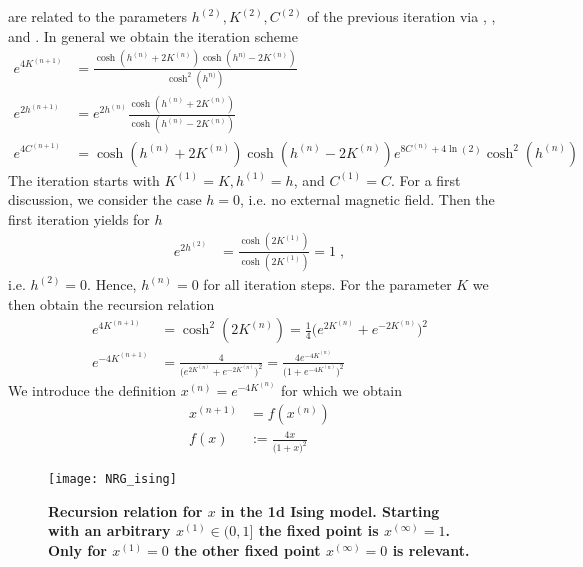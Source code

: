 are related to the parameters $h^{(2)},K^{(2)},C^{(2)}$ of the previous iteration via , , and . In general we obtain the iteration scheme
\begin{subequations}\label{eq:iteration}
\begin{align}
e^{4K^{(n+1)} } &= \frac{\cosh(h^{(n)}+2K^{(n)})\cosh(h^{n)}-2K^{(n)})}{\cosh^{2}(h^{n)})}\\
e^{2h^{(n+1)}} &= e^{2h^{(n)}}\frac{\cosh(h^{(n)}+2K^{(n)})}{\cosh(h^{(n)}-2K^{(n)})}\\
 e^{4C^{(n+1)}} &= \cosh(h^{(n)}+2K^{(n)})\cosh(h^{(n)}-2K^{(n)}) e^{8C^{(n)} + 4\ln(2)} \cosh^{2}(h^{(n)})\;
\end{align}
\end{subequations}
The iteration starts with $K^{(1)}=K, h^{(1)}=h$, and $C^{(1)}=C$.
For a first discussion, we consider the case $h=0$, i.e. no external magnetic field. Then the first iteration yields for $h$
\begin{subequations}\label{eq:iteration:h:0}
\begin{align}
e^{2h^{(2)}} &= \frac{\cosh(2K^{(1)})}{\cosh(2K^{(1)})}=1\;,
\end{align}
\end{subequations}
i.e. $h^{(2)}=0$. Hence, $h^{(n)}=0$ for all iteration steps. For the  parameter $K$ we then obtain
the recursion relation
\begin{align}\label{eq:rec:rel:K}
e^{4K^{(n+1)} } &= \cosh^{2}(2K^{(n)}) =
\frac{1}{4}\bigg( e^{2 K^{(n)}}+e^{-2 K^{(n)}} \bigg)^{2}\\
e^{-4K^{(n+1)} } &= 
\frac{4}{\big( e^{2 K^{(n)}}+e^{-2 K^{(n)}} \big)^{2}}
=\frac{4 e^{-4 K^{(n)}}}{\big( 1+e^{-4 K^{(n)}} \big)^{2}}
\end{align}
We introduce the definition  $x^{(n)} = e^{-4 K^{(n)}}$ for which we obtain
%
\begin{align*}
x^{(n+1)} &= f(x^{(n)})\\
f(x) &:=\frac{4 x}{\big( 1+x \big)^{2}}
\end{align*}
%
\begin{figure}[htbp]
\begin{center}
\texttt{[image: NRG\_ising]}
\caption{{\bf Recursion relation for $x$ in the 1d Ising model. Starting with an arbitrary $x^{(1)}\in(0,1]$ the fixed point is $x^{(\infty)}=1$. Only for
$x^{(1)}=0$ the other fixed point $x^{(\infty)}=0$ is relevant.}}
\label{fig:RNG_ising_x}
\end{center}
\end{figure}

